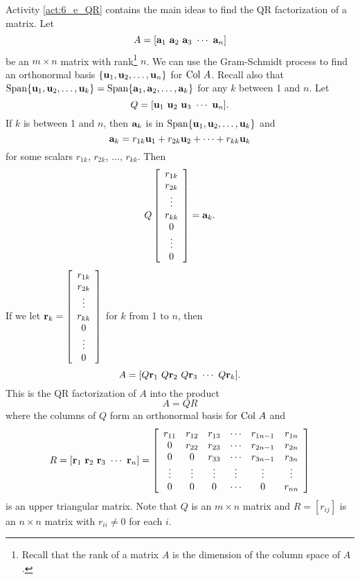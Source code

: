 Activity \ref{act:6_e_QR} contains the main ideas to find the QR factorization of a matrix. Let 
\[A = [\mathbf{a}_1  \ \mathbf{a}_2  \ \mathbf{a}_3  \ \cdots  \ \mathbf{a}_n ]\]
be an $m \times n$ matrix with rank\footnote{Recall that the rank of a matrix $A$ is the dimension of the column space of $A$.} $n$. We can use the Gram-Schmidt process to find an orthonormal basis $\{\mathbf{u}_1, \mathbf{u}_2, \ldots, \mathbf{u}_n\}$ for $\text{Col } A$. Recall also that $\text{Span}\{\mathbf{u}_1, \mathbf{u}_2, \ldots, \mathbf{u}_k\}  = \text{Span}\{\mathbf{a}_1, \mathbf{a}_2, \ldots, \mathbf{a}_k\}$ for any $k$ between 1 and $n$. Let
\[Q = [\mathbf{u}_1 \   \mathbf{u}_2 \  \mathbf{u}_3 \  \cdots \  \mathbf{u}_n ].\]
If $k$ is between 1 and $n$, then $\mathbf{a}_k$ is in $\text{Span}\{\mathbf{u}_1, \mathbf{u}_2, \ldots, \mathbf{u}_k\}$ and
\[\mathbf{a}_k = r_{1k}\mathbf{u}_1 + r_{2k}\mathbf{u}_2 + \cdots + r_{kk}\mathbf{u}_k\]
for some scalars $r_{1k}$, $r_{2k}$, $\ldots$, $r_{kk}$. Then
\[Q \left[ \begin{array}{c} r_{1k} \\ r_{2k} \\ \vdots \\ r_{kk} \\ 0 \\ \vdots \\ 0 \end{array} \right] = \mathbf{a}_k.\]
If we let $\mathbf{r}_k = \left[ \begin{array}{c} r_{1k} \\ r_{2k} \\ \vdots \\ r_{kk} \\ 0 \\ \vdots \\ 0 \end{array} \right]$ for $k$ from 1 to $n$, then
\[A = [Q\vr_1  \ Q\vr_2  \ Q\vr_3  \ \cdots  \ Q\vr_k].\]
This is the QR factorization of $A$ into the product
\[A = QR\]
where the columns of $Q$ form an orthonormal basis for $\text{Col } A$ and
\[R = [\vr_1  \ \vr_2  \ \vr_3  \ \cdots  \ \vr_n ] = \left[ \begin{array}{cccccc} r_{11}&r_{12}&r_{13}& \cdots &r_{1n-1}&r_{1n} \\ 0&r_{22}&r_{23}& \cdots &r_{2n-1}&r_{2n} \\ 0&0&r_{33}& \cdots &r_{3n-1}&r_{3n} \\ \vdots&\vdots &\vdots &\vdots &\vdots &\vdots \\ 0&0&0& \cdots &0&r_{nn} \end{array} \right]\]
is an upper triangular matrix. Note that $Q$ is an $m \times n$ matrix and $R = [r_{ij}]$ is an $n \times n$ matrix with $r_{ii} \neq 0$ for each $i$.

